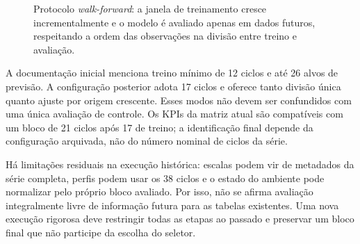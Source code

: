 \begin{figure}[htbp]
\centering
{}
\caption{Protocolo \textit{walk-forward}: a janela de treinamento cresce incrementalmente e o modelo é avaliado apenas em dados futuros, respeitando a ordem das observações na divisão entre treino e avaliação.}
\label{fig:walkforward}
\end{figure}

A documentação inicial menciona treino mínimo de 12 ciclos e até 26 alvos de previsão. A configuração posterior adota 17 ciclos e oferece tanto divisão única quanto ajuste por origem crescente. Esses modos não devem ser confundidos com uma única avaliação de controle. Os KPIs da matriz atual são compatíveis com um bloco de 21 ciclos após 17 de treino; a identificação final depende da configuração arquivada, não do número nominal de ciclos da série.

Há limitações residuais na execução histórica: escalas podem vir de metadados da série completa, perfis podem usar os 38 ciclos e o estado do ambiente pode normalizar pelo próprio bloco avaliado. Por isso, não se afirma avaliação integralmente livre de informação futura para as tabelas existentes. Uma nova execução rigorosa deve restringir todas as etapas ao passado e preservar um bloco final que não participe da escolha do seletor.

